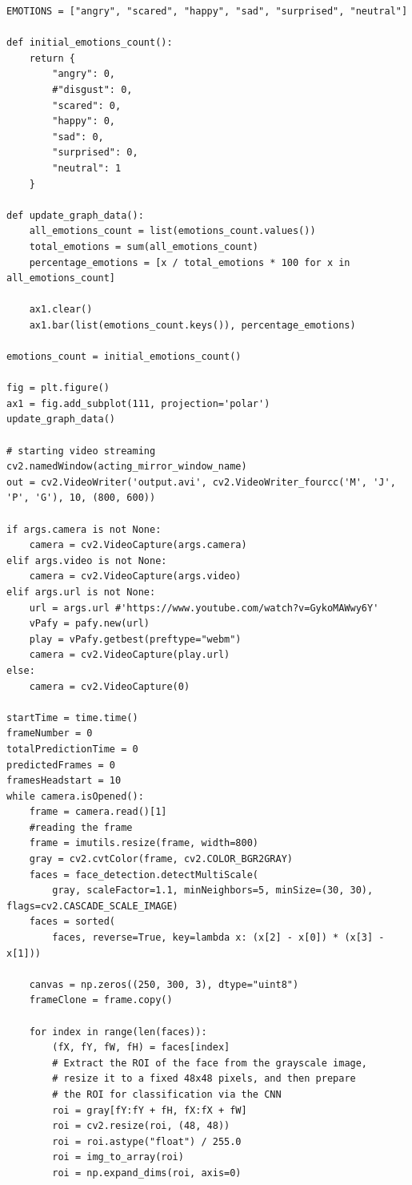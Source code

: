 \documentclass[runningheads,a4paper,11pt]{report}
\begin{document}
\begin{appendices}
\begin{lstlisting}
EMOTIONS = ["angry", "scared", "happy", "sad", "surprised", "neutral"]

def initial_emotions_count():
    return {
        "angry": 0,
        #"disgust": 0,
        "scared": 0,
        "happy": 0,
        "sad": 0,
        "surprised": 0,
        "neutral": 1
    }

def update_graph_data():
    all_emotions_count = list(emotions_count.values())
    total_emotions = sum(all_emotions_count)
    percentage_emotions = [x / total_emotions * 100 for x in all_emotions_count]

    ax1.clear()
    ax1.bar(list(emotions_count.keys()), percentage_emotions)

emotions_count = initial_emotions_count()

fig = plt.figure()
ax1 = fig.add_subplot(111, projection='polar')
update_graph_data()

# starting video streaming
cv2.namedWindow(acting_mirror_window_name)
out = cv2.VideoWriter('output.avi', cv2.VideoWriter_fourcc('M', 'J', 'P', 'G'), 10, (800, 600))

if args.camera is not None:
    camera = cv2.VideoCapture(args.camera)
elif args.video is not None:
    camera = cv2.VideoCapture(args.video)
elif args.url is not None:
    url = args.url #'https://www.youtube.com/watch?v=GykoMAWwy6Y'
    vPafy = pafy.new(url)
    play = vPafy.getbest(preftype="webm")
    camera = cv2.VideoCapture(play.url)
else:
    camera = cv2.VideoCapture(0)

startTime = time.time()
frameNumber = 0
totalPredictionTime = 0
predictedFrames = 0
framesHeadstart = 10
while camera.isOpened():
    frame = camera.read()[1]
    #reading the frame
    frame = imutils.resize(frame, width=800)
    gray = cv2.cvtColor(frame, cv2.COLOR_BGR2GRAY)
    faces = face_detection.detectMultiScale(
        gray, scaleFactor=1.1, minNeighbors=5, minSize=(30, 30), flags=cv2.CASCADE_SCALE_IMAGE)
    faces = sorted(
        faces, reverse=True, key=lambda x: (x[2] - x[0]) * (x[3] - x[1]))

    canvas = np.zeros((250, 300, 3), dtype="uint8")
    frameClone = frame.copy()

    for index in range(len(faces)):
        (fX, fY, fW, fH) = faces[index]
        # Extract the ROI of the face from the grayscale image, 
        # resize it to a fixed 48x48 pixels, and then prepare
        # the ROI for classification via the CNN
        roi = gray[fY:fY + fH, fX:fX + fW]
        roi = cv2.resize(roi, (48, 48))
        roi = roi.astype("float") / 255.0
        roi = img_to_array(roi)
        roi = np.expand_dims(roi, axis=0)
                

\end{lstlisting}
\end{appendices}
\end{document}
